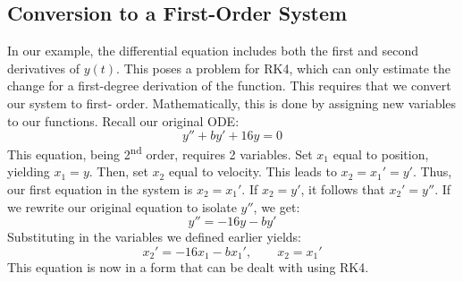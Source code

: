 \documentclass{article}
\begin{document}
\subsection{Conversion to a First-Order System}
In our example, the differential equation includes both the first and second derivatives of $y(t)$. This poses a problem for RK4, 
which can only estimate the change for a first-degree derivation of the function. This requires that we convert our system to first-
order. Mathematically, this is done by assigning new variables to our functions. Recall our original ODE:
$$y'' + by' + 16y = 0$$
This equation, being 2\textsuperscript{nd} order, requires 2 variables. Set $x_1$ equal to position, yielding $x_1 = y$. Then, set 
$x_2$ equal to velocity. This leads to $x_2 = x_1' = y'$. Thus, our first equation in the system is $x_2 = x_1'$. If $x_2 = y'$, it 
follows that $x_2' = y''$. If we rewrite our original equation to isolate $y''$, we get:
$$y'' = -16y - by'$$
Substituting in the variables we defined earlier yields:
$$x_2' = -16x_1 - bx_1', \qquad x_2 = x_1'$$
This equation is now in a form that can be dealt with using RK4.
\end{document}
